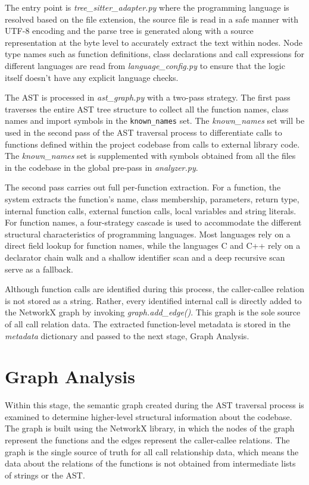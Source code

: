 \par The entry point is \textit{tree\_sitter\_adapter.py} where the programming language is resolved based on the file extension, the source file is read in a safe manner with UTF-8 encoding and the parse tree is generated along with a source representation at the byte level to accurately extract the text within nodes. Node type names such as function definitions, class declarations and call expressions for different languages are read from \textit{language\_config.py} to ensure that the logic itself doesn’t have any explicit language checks.

\par The AST is processed in \textit{ast\_graph.py} with a two-pass strategy. The first pass traverses the entire AST tree structure to collect all the function names, class names and import symbols in the \texttt{known\_names} set. The \textit{known\_names} set will be used in the second pass of the AST traversal process to differentiate calls to functions defined within the project codebase from calls to external library code. The \textit{known\_names} set is supplemented with symbols obtained from all the files in the codebase in the global pre-pass in \textit{analyzer.py}.

\par The second pass carries out full per-function extraction. For a function, the system extracts the function's name, class membership, parameters, return type, internal function calls, external function calls, local variables and string literals. For function names, a four-strategy cascade is used to accommodate the different structural characteristics of programming languages. Most languages rely on a direct field lookup for function names, while the languages C and C++ rely on a declarator chain walk and a shallow identifier scan and a deep recursive scan serve as a fallback.

\par Although function calls are identified during this process, the caller-callee relation is not stored as a string. Rather, every identified internal call is directly added to the NetworkX graph by invoking \textit{graph.add\_edge()}. This graph is the sole source of all call relation data. The extracted function-level metadata is stored in the \textit{metadata} dictionary and passed to the next stage, Graph Analysis.


\section{Graph Analysis}
\hspace{0.5cm}
Within this stage, the semantic graph created during the AST traversal process is examined to determine higher-level structural information about the codebase. The graph is built using the NetworkX library, in which the nodes of the graph represent the functions and the edges represent the caller-callee relations. The graph is the single source of truth for all call relationship data, which means the data about the relations of the functions is not obtained from intermediate lists of strings or the AST.

